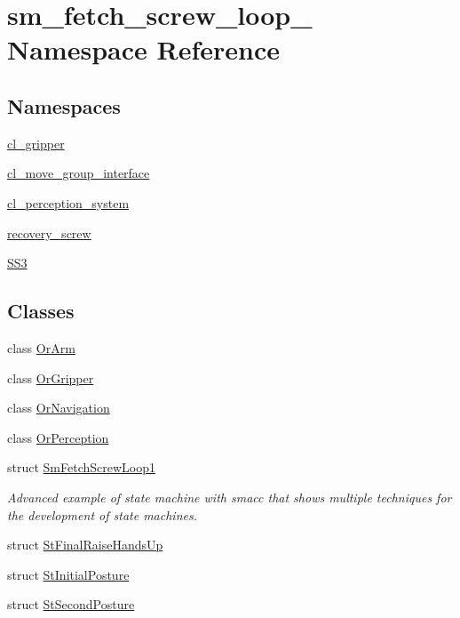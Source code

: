 \hypertarget{namespacesm__fetch__screw__loop__1}{}\section{sm\+\_\+fetch\+\_\+screw\+\_\+loop\+\_ Namespace Reference}
\label{namespacesm__fetch__screw__loop__1}
\subsection*{Namespaces}
\begin{DoxyCompactItemize}
\item 
 \hyperlink{namespacesm__fetch__screw__loop__1_1_1cl__gripper}{cl\+\_\+gripper}
\item 
 \hyperlink{namespacesm__fetch__screw__loop__1_1_1cl__move__group__interface}{cl\+\_\+move\+\_\+group\+\_\+interface}
\item 
 \hyperlink{namespacesm__fetch__screw__loop__1_1_1cl__perception__system}{cl\+\_\+perception\+\_\+system}
\item 
 \hyperlink{namespacesm__fetch__screw__loop__1_1_1recovery__screw}{recovery\+\_\+screw}
\item 
 \hyperlink{namespacesm__fetch__screw__loop__1_1_1SS3}{S\+S3}
\end{DoxyCompactItemize}
\subsection*{Classes}
\begin{DoxyCompactItemize}
\item 
class \hyperlink{classsm__fetch__screw__loop__1_1_1OrArm}{Or\+Arm}
\item 
class \hyperlink{classsm__fetch__screw__loop__1_1_1OrGripper}{Or\+Gripper}
\item 
class \hyperlink{classsm__fetch__screw__loop__1_1_1OrNavigation}{Or\+Navigation}
\item 
class \hyperlink{classsm__fetch__screw__loop__1_1_1OrPerception}{Or\+Perception}
\item 
struct \hyperlink{structsm__fetch__screw__loop__1_1_1SmFetchScrewLoop1}{Sm\+Fetch\+Screw\+Loop1}
\begin{DoxyCompactList}\small\item\em Advanced example of state machine with smacc that shows multiple techniques for the development of state machines. \end{DoxyCompactList}\item 
struct \hyperlink{structsm__fetch__screw__loop__1_1_1StFinalRaiseHandsUp}{St\+Final\+Raise\+Hands\+Up}
\item 
struct \hyperlink{structsm__fetch__screw__loop__1_1_1StInitialPosture}{St\+Initial\+Posture}
\item 
struct \hyperlink{structsm__fetch__screw__loop__1_1_1StSecondPosture}{St\+Second\+Posture}
\end{DoxyCompactItemize}
